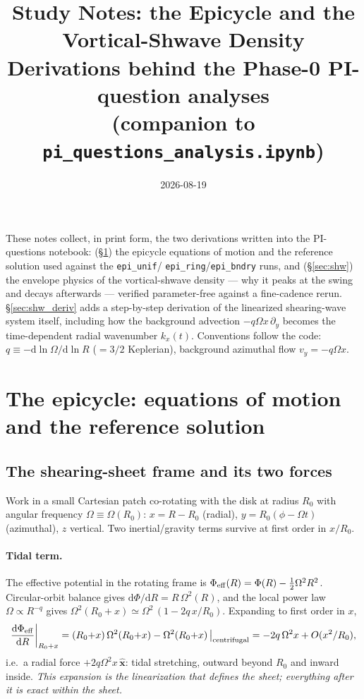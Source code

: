 \documentclass[11pt]{article}
\title{Study Notes: the Epicycle and the Vortical-Shwave Density\\
\large Derivations behind the Phase-0 PI-question analyses\\
(companion to \texttt{pi\_questions\_analysis.ipynb})}
\author{}
\date{2026-08-19}
\newcommand{\dd}{\mathrm{d}}
\begin{document}
\maketitle

\noindent These notes collect, in print form, the two derivations written into the
PI-questions notebook: (\S\ref{sec:epi}) the epicycle equations of motion and the
reference solution used against the \texttt{epi\_unif}/\allowbreak
\texttt{epi\_ring}/\allowbreak\texttt{epi\_bndry} runs, and (\S\ref{sec:shw}) the envelope physics of the
vortical-shwave density --- why it peaks at the swing and decays afterwards ---
verified parameter-free against a fine-cadence rerun. \S\ref{sec:shw_deriv} adds a
step-by-step derivation of the linearized shearing-wave system itself, including
how the background advection $-q\Omega x\,\partial_y$ becomes the time-dependent
radial wavenumber $k_x(t)$. Conventions follow the code:
$q \equiv -\dd\ln\Omega/\dd\ln R$ ($=3/2$ Keplerian), background azimuthal flow
$v_y = -q\Omega x$.

\section{The epicycle: equations of motion and the reference solution}
\label{sec:epi}

\subsection{The shearing-sheet frame and its two forces}
Work in a small Cartesian patch co-rotating with the disk at radius $R_0$ with
angular frequency $\Omega \equiv \Omega(R_0)$: $x = R - R_0$ (radial),
$y = R_0(\phi - \Omega t)$ (azimuthal), $z$ vertical. Two inertial/gravity terms
survive at first order in $x/R_0$.

\paragraph{Tidal term.} The effective potential in the rotating frame is
$\Phi_{\rm eff}(R) = \Phi(R) - \tfrac12\Omega^2R^2$. Circular-orbit balance gives
$\dd\Phi/\dd R = R\,\Omega^2(R)$, and the local power law $\Omega \propto R^{-q}$
gives $\Omega^2(R_0{+}x) \simeq \Omega^2\,(1 - 2q\,x/R_0)$. Expanding to first
order in $x$,
\begin{equation}
\frac{\dd\Phi_{\rm eff}}{\dd R}\bigg|_{R_0+x}
 = (R_0{+}x)\,\Omega^2(R_0{+}x) - \Omega^2(R_0{+}x)\,\big|_{\rm centrifugal}
 = -2q\,\Omega^2 x + O(x^2/R_0),
\end{equation}
i.e.\ a radial force $+2q\Omega^2x\,\hat{\mathbf x}$: tidal stretching, outward
beyond $R_0$ and inward inside. \emph{This expansion is the linearization that
defines the sheet; everything after it is exact within the sheet.}
\end{document}
